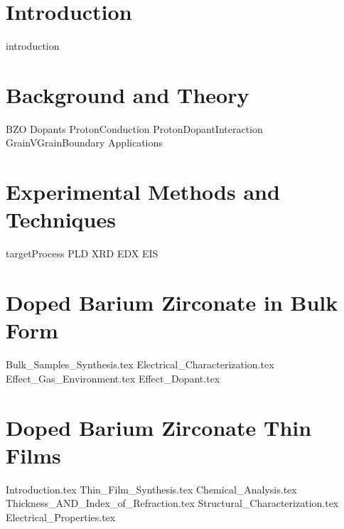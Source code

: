 \documentclass[phd, reqno]{uab-thesis}   %
\begin{document}

\mainmatter


%
%


\chapter{Introduction}
\label{ch:intro}
{introduction}


\chapter{Background and Theory}
\label{ch:background}
{BZO}
{Dopants}
{ProtonConduction}
{ProtonDopantInteraction}
{GrainVGrainBoundary}
{Applications}

\chapter{Experimental Methods and Techniques}
\label{ch:methods}
{targetProcess}
{PLD}
{XRD}
{EDX}
{EIS}

\chapter{Doped Barium Zirconate in Bulk Form}
\label{ch:bulk}
{Bulk_Samples_Synthesis.tex}
{Electrical_Characterization.tex}
{Effect_Gas_Environment.tex}
{Effect_Dopant.tex}

\chapter{Doped Barium Zirconate Thin Films}
\label{ch:films}
{Introduction.tex}
{Thin_Film_Synthesis.tex}
{Chemical_Analysis.tex}
{Thickness_AND_Index_of_Refraction.tex}
{Structural_Characterization.tex}
{Electrical_Properties.tex}
\end{document}
